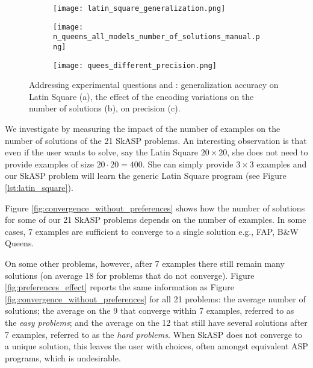 \begin{figure}[!thb]
  \centering
  \begin{subfigure}[t]{0.49\textwidth}
    \texttt{[image: latin\_square\_generalization.png]}
    \caption{}
    \label{fig:latin_square_generalization}
  \end{subfigure}
  \hfill
  \begin{subfigure}[t]{0.49\textwidth}
    \texttt{[image: n\_queens\_all\_models\_number\_of\_solutions\_manual.png]}
    \caption{}
    \label{fig:systematic_solutions}
  \end{subfigure}
  \hfill
  \begin{subfigure}[t]{0.49\textwidth}
    \texttt{[image: quees\_different\_precision.png]}
    \caption{}
    \label{fig:systematic_precision}
  \end{subfigure}
  \caption{Addressing experimental questions \qfour and \qfive: generalization accuracy on Latin Square (a), the effect of the encoding variations on the number of solutions (b), on precision (c).}
\end{figure}

We investigate \qone by measuring the impact of the number of examples 
on the number of solutions of the 21 SkASP problems. 
An interesting observation is that even if the user wants to 
solve, say the Latin Square $20\times 20$, she does not need to provide 
examples of size $20\cdot 20= 400$. She can simply provide $3\times 3$ examples 
and our SkASP problem will learn the generic 
Latin Square program (see Figure \ref{lst:latin_square}). 

Figure \ref{fig:convergence_without_preferences} shows how the number of solutions 
for some of our 21 SkASP problems depends on the number of examples. 
In some cases, 7 examples are sufficient 
to converge to a single solution e.g., FAP, B\&W Queens. 
%

On some other problems, however, after 7 examples there still remain 
many solutions (on average 18 for problems that do not converge). 
Figure \ref{fig:preferences_effect} reports the same information as Figure \ref{fig:convergence_without_preferences} for all 21 problems: the average number of solutions; the average on the 9 that 
converge within 7 examples, referred to as the \textit{easy problems}; and the average on the 12 that still have several 
solutions after 7 examples, referred to as the \textit{hard problems}. 
When SkASP  does not converge to a unique solution, this leaves 
the user with choices, often amongst equivalent ASP programs, which is undesirable.  

